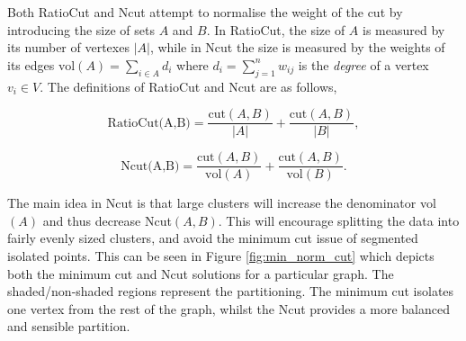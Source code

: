 Both RatioCut and Ncut attempt to normalise the weight of the cut by introducing the size of sets $A$ and $B$. In RatioCut, the size of $A$ is measured by its number of vertexes $|A|$, while in Ncut the size is measured by the weights of its edges $\text{vol}(A) = \sum_{i \in A}d_i$ where $d_i= \sum_{j = 1}^n w_{ij}$ is the \textit{degree} of a vertex $v_i \in V$. The definitions of RatioCut and Ncut are as follows, 

\begin{equation}
  \text{RatioCut(A,B)} = \frac{\text{cut} (A, B)}{|A|} + \frac{\text{cut}(A, B)}{|B|}, 
    \label{eq:ratiocut}
\end{equation}

\begin{equation}
  \text{Ncut(A,B)} = \frac{\text{cut}(A, B)}{\text{vol}(A)} + \frac{\text{cut}(A, B)}{\text{vol}(B)}.
    \label{eq:ncut}
\end{equation}

The main idea in Ncut is that large clusters will increase the denominator vol$(A)$ and thus decrease Ncut$(A,B)$. This will encourage splitting the data into fairly evenly sized clusters, and avoid the minimum cut issue of segmented isolated points. This can be seen in Figure \ref{fig:min_norm_cut}  which depicts both the minimum cut and Ncut solutions for a particular graph. The shaded/non-shaded regions represent the partitioning. The minimum cut isolates one vertex from the rest of the graph, whilst the Ncut provides a more balanced and sensible partition. 

